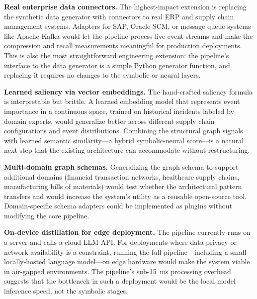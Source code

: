 \textbf{Real enterprise data connectors.} The highest-impact extension is replacing the
synthetic data generator with connectors to real ERP and supply chain management systems.
Adapters for SAP, Oracle SCM, or message queue systems like Apache Kafka would let the
pipeline process live event streams and make the compression and recall measurements
meaningful for production deployments. This is also the most straightforward engineering
extension: the pipeline's interface to the data generator is a simple Python generator
function, and replacing it requires no changes to the symbolic or neural layers.

\textbf{Learned saliency via vector embeddings.} The hand-crafted saliency formula is
interpretable but brittle. A learned embedding model that represents event importance in a
continuous space, trained on historical incidents labeled by domain experts, would generalize
better across different supply chain configurations and event distributions. Combining the
structural graph signals with learned semantic similarity---a hybrid symbolic-neural score---is
a natural next step that the existing architecture can accommodate without restructuring.

\textbf{Multi-domain graph schemas.} Generalizing the graph schema to support additional
domains (financial transaction networks, healthcare supply chains, manufacturing bills of
materials) would test whether the architectural pattern transfers and would increase the
system's utility as a reusable open-source tool. Domain-specific schema adapters could
be implemented as plugins without modifying the core pipeline.

\textbf{On-device distillation for edge deployment.} The pipeline currently runs on a
server and calls a cloud LLM API. For deployments where data privacy or network availability
is a constraint, running the full pipeline---including a small locally-hosted language
model---on edge hardware would make the system viable in air-gapped environments. The
pipeline's sub-15~ms processing overhead suggests that the bottleneck in such a deployment
would be the local model inference speed, not the symbolic stages.
